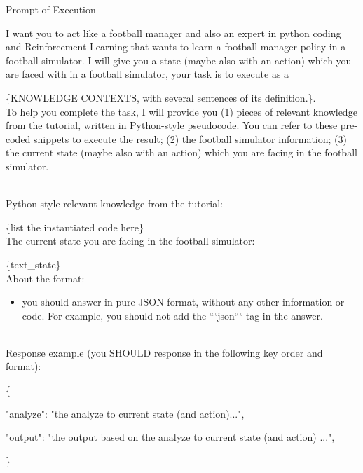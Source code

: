 \begin{gbox}{Prompt of Execution}

I want you to act like a football manager and also an expert in python coding and Reinforcement Learning that wants to learn a football manager policy in a football simulator. 
I will give you a state (maybe also with an action) which you are faced with in a football simulator, your task is to execute as a 

\hspace{10mm} \{KNOWLEDGE CONTEXTS, with several sentences of its definition.\}.
~\\

To help you complete the task, I will provide you (1) pieces of relevant knowledge from the tutorial, written in Python-style pseudocode. You can refer to these pre-coded snippets to execute the result; (2) the football simulator information; (3) the current state  (maybe also with an action)  which you are facing in the football simulator.


~\\

Python-style relevant knowledge from the tutorial:

\hspace{10mm} \{list the instantiated code here\}
~\\

The current state you are facing in the football simulator:

\hspace{10mm} \{text\_state\}
~\\

About the format:
\begin{itemize}
    \item you should answer in pure JSON format, without any other information or code. For example, you should not add the ```json``` tag in the answer.
\end{itemize}
                    ~\\

Response example (you SHOULD response in the following key order and format):

\{

\hspace{5mm} "analyze": "the analyze to current state  (and action)...",   

\hspace{5mm} "output": "the output based on the analyze to current state (and action) ...",

\}

\end{gbox}

